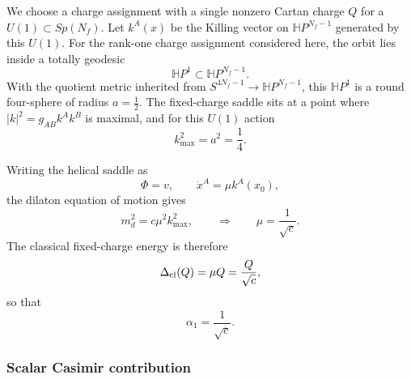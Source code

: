 \documentclass[a4paper,11pt]{article}
\begin{document}
We choose a charge assignment with a single nonzero Cartan charge $Q$ for a $U(1)\subset Sp(N_f)$. Let $k^A(x)$ be the Killing vector on $\mathbb HP^{N_f-1}$ generated by this $U(1)$. For the rank-one charge
assignment considered here, the orbit lies inside a totally geodesic
\begin{equation}
  \mathbb HP^1\subset \mathbb HP^{N_f-1}.
\end{equation}
With the quotient metric inherited from $S^{4N_f-1}\to\mathbb HP^{N_f-1}$, this $\mathbb HP^1$ is a round
four-sphere of radius $a=\frac12$. The fixed-charge saddle sits at a point where $|k|^2=g_{AB}k^Ak^B$ is maximal, and for this $U(1)$ action
\begin{equation}
  k_{\max}^2=a^2=\frac14.
\end{equation}

Writing the helical saddle as
\begin{equation}
  \Phi=v, \qquad \dot x^A=\mu k^A(x_0),
\end{equation}
the dilaton equation of motion gives
\begin{equation}
  m_d^2=c\mu^2 k_{\max}^2, \qquad\Rightarrow\qquad \mu=\frac1{\sqrt c}.
\end{equation}
The classical fixed-charge energy is therefore
\begin{equation}
  \Delta_{\rm cl}(Q)=\mu Q=\frac{Q}{\sqrt c},
\end{equation}
so that
\begin{equation}
  \alpha_1=\frac1{\sqrt c}.
\end{equation}


\subsubsection{Scalar Casimir contribution}
\end{document}
